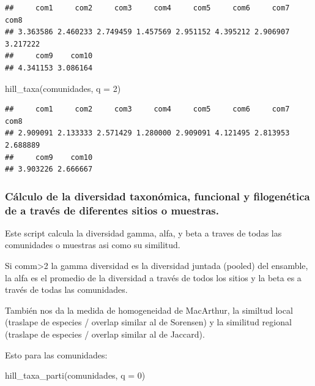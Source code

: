 \documentclass[
]{article}
\newenvironment{Shaded}{\begin{snugshade}}{\end{snugshade}}
\newcommand{\AttributeTok}[1]{\textcolor[rgb]{0.77,0.63,0.00}{#1}}
\newcommand{\DecValTok}[1]{\textcolor[rgb]{0.00,0.00,0.81}{#1}}
\newcommand{\FunctionTok}[1]{\textcolor[rgb]{0.00,0.00,0.00}{#1}}
\newcommand{\NormalTok}[1]{#1}
\begin{document}
\begin{verbatim}
##     com1     com2     com3     com4     com5     com6     com7     com8 
## 3.363586 2.460233 2.749459 1.457569 2.951152 4.395212 2.906907 3.217222 
##     com9    com10 
## 4.341153 3.086164
\end{verbatim}

\begin{Shaded}
\begin{Highlighting}[]
\FunctionTok{hill\_taxa}\NormalTok{(comunidades, }\AttributeTok{q =} \DecValTok{2}\NormalTok{)}
\end{Highlighting}
\end{Shaded}

\begin{verbatim}
##     com1     com2     com3     com4     com5     com6     com7     com8 
## 2.909091 2.133333 2.571429 1.280000 2.909091 4.121495 2.813953 2.688889 
##     com9    com10 
## 3.903226 2.666667
\end{verbatim}

\hfill\break

\hypertarget{cuxe1lculo-de-la-diversidad-taxonuxf3mica-funcional-y-filogenuxe9tica-de-a-travuxe9s-de-diferentes-sitios-o-muestras.}{%
\subsubsection{Cálculo de la diversidad taxonómica, funcional y
filogenética de a través de diferentes sitios o
muestras.}\label{cuxe1lculo-de-la-diversidad-taxonuxf3mica-funcional-y-filogenuxe9tica-de-a-travuxe9s-de-diferentes-sitios-o-muestras.}}

Este script calcula la diversidad gamma, alfa, y beta a traves de todas
las comunidades o muestras asi como su similitud.

Si comm\textgreater2 la gamma diversidad es la diversidad juntada
(pooled) del ensamble, la alfa es el promedio de la diversidad a través
de todos los sitios y la beta es a través de todas las comunidades.

También nos da la medida de homogeneidad de MacArthur, la similtud local
(traslape de especies / overlap similar al de Sorensen) y la similitud
regional (traslape de especies / overlap similar al de Jaccard).

Esto para las comunidades:\\

\begin{Shaded}
\begin{Highlighting}[]
\FunctionTok{hill\_taxa\_parti}\NormalTok{(comunidades, }\AttributeTok{q =} \DecValTok{0}\NormalTok{)}
\end{Highlighting}
\end{Shaded}
\end{document}
